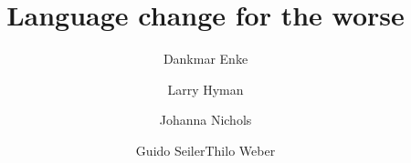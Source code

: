 \title{Language change for the worse}
\author{Dankmar Enke\and Larry Hyman\and Johanna Nichols\and Guido Seiler\lastand Thilo Weber}
\renewcommand{\lsSeries}{sidl}%
\renewcommand{\lsSeriesNumber}{}
\lsCoverTitleSizes{51.5pt}{17pt}
